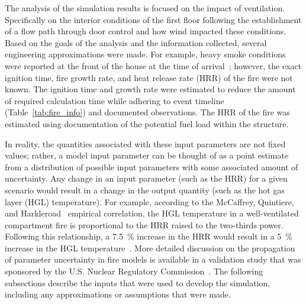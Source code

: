 \documentclass[12pt,oneside]{book}
\begin{document}
The analysis of the simulation results is focused on the impact of ventilation. Specifically on the  interior conditions of the first floor following the establishment of a flow path through door control and how wind impacted these conditions. Based on the goals of the analysis and the information collected, several engineering approximations were made. For example, heavy smoke conditions were reported at the front of the house at the time of arrival~\cite{PGCounty2013}; however, the exact ignition time, fire growth rate, and heat release rate (HRR) of the fire were not known. The ignition time and growth rate were estimated to reduce the amount of required calculation time while adhering to event timeline (Table~\ref{tab:fire_info}) and documented observations. The HRR of the fire was estimated using documentation of the potential fuel load within the structure.

In reality, the quantities associated with these input parameters are not fixed values; rather, a model input parameter can be thought of as a point estimate from a distribution of possible input parameters with some associated amount of uncertainty. Any change in an input parameter (such as the HRR) for a given scenario would result in a change in the output quantity (such as the hot gas layer (HGL) temperature). For example, according to the McCaffrey, Quintiere, and Harkleroad~\cite{SFPE:Walton} empirical correlation, the HGL temperature in a well-ventilated compartment fire is proportional to the HRR raised to the two-thirds power. Following this relationship, a 7.5~\% increase in the HRR would result in a 5~\% increase in the HGL temperature~\cite{NUREG_1824_Sup_1}. More detailed discussion on the propagation of parameter uncertainty in fire models is available in a validation study that was sponsored by the U.S. Nuclear Regulatory Commission~\cite{NUREG_1824_Sup_1}. The following subsections describe the inputs that were used to develop the simulation, including any approximations or assumptions that were made.
\end{document}
